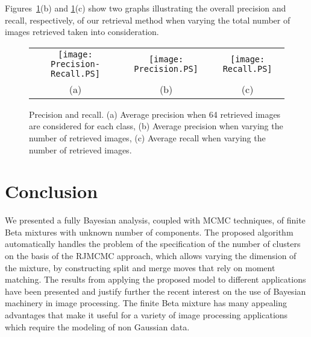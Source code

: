 \documentclass[journal,10pt]{elsart}
\begin{document}
Figures~\ref{fig:500}(b) and \ref{fig:500}(c) show two graphs illustrating the overall precision and recall, respectively, of our retrieval method
when varying the total number of images retrieved
taken into consideration.
\begin{figure}[!ht]
\begin{center}
\begin{tabular}{ccc}
\texttt{[image: Precision-Recall.PS]}
&
\texttt{[image: Precision.PS]}
&
\texttt{[image: Recall.PS]}\\
(a)&(b)&(c)
\end{tabular}
\caption{Precision and recall. (a) Average precision when 64 retrieved images are considered for each class, (b) Average precision
when varying the number of retrieved images, (c) Average recall when varying the number of retrieved images.} \label{fig:500}
\end{center}
\end{figure}
\section{Conclusion}
We presented a fully Bayesian analysis, coupled with MCMC techniques, of finite Beta mixtures with unknown number of components.
The proposed algorithm automatically handles the problem of the specification of the number of clusters on the basis of the RJMCMC approach,
which allows varying the dimension of the mixture, by constructing split and merge moves that rely on moment matching.
The results from applying the proposed model to different applications have been presented and justify further the recent interest on the use of
Bayesian machinery in image processing. The finite Beta mixture has many appealing advantages that make it useful for a variety of image processing
applications which require the modeling of non Gaussian data.
\end{document}
